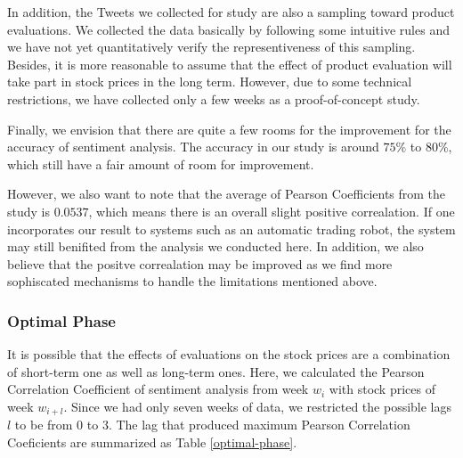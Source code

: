 \documentclass[12pt]{article}
\begin{document}
In addition, the Tweets we collected for study are also a sampling toward product evaluations. We collected the data basically by following some intuitive rules and we have not yet quantitatively verify the representiveness of this sampling. Besides, it is more reasonable to assume that the effect of product evaluation will take part in stock prices in the long term. However, due to some technical restrictions, we have collected only a few weeks as a proof-of-concept study.

Finally, we envision that there are quite a few rooms for the improvement for the accuracy of sentiment analysis. The accuracy in our study is around $75\%$ to $80\%$, which still have a fair amount of room for improvement.

However, we also want to note that the average of Pearson Coefficients from the study is $0.0537$, which means there is an overall slight positive correalation. If one incorporates our result to systems such as an automatic trading robot, the system may still benifited from the analysis we conducted here. In addition, we also believe that the positve correalation may be improved as we find more sophiscated mechanisms to handle the limitations mentioned above.

\subsubsection{Optimal Phase}
It is possible that the effects of evaluations on the stock prices are a combination of short-term one as well as long-term ones. Here, we calculated the Pearson Correlation Coefficient of sentiment analysis from week $w_i$ with stock prices of week $w_{i+l}$. Since we had only seven weeks of data, we restricted the possible lags $l$ to be from $0$ to $3$. The lag that produced maximum Pearson Correlation Coeficients are summarized as Table \ref{optimal-phase}.
\end{document}
